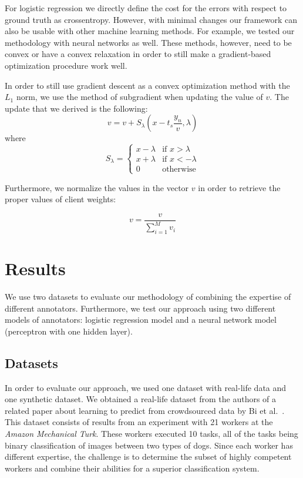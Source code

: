 \documentclass{llncs}
\begin{document}
 


For logistic regression we directly define the cost for the errors with respect to ground truth as crossentropy. However, with minimal changes our framework can also be usable with other machine learning methods. For example, we tested our methodology with neural networks as well. These methods, however, need to be convex or have a convex relaxation in order to still make a gradient-based optimization procedure work well.

In order to still use gradient descent as a convex optimization method with the $L_1$ norm, we use the method of subgradient when updating the value of $v$. The update that we derived is the following:
\begin{equation}
 v= v + S_{\lambda} (x-t_s \frac{y_n}{v}, \lambda)
\end{equation}
where
\begin{equation}
S_{\lambda} = 
\left\{
	\begin{array}{ll}
		x-\lambda  & \mbox{if } x > \lambda  \\
		x+\lambda & \mbox{if } x < -\lambda \\
		0 & \mbox{otherwise}
	\end{array}
\right.
\end{equation}

Furthermore, we normalize the values in the vector $v$ in order to retrieve the proper values of client weights:

\begin{equation}
v = \frac{v}{\sum_{i=1}^M v_i}
\end{equation}

 

\section{Results}

We use two datasets to evaluate our methodology of combining the expertise of different annotators. Furthermore, we test our approach using two different models of annotators: logistic regression model and a neural network model (perceptron with one hidden layer).

\subsection{Datasets}
In order to evaluate our approach, we used one dataset with real-life data and one synthetic dataset. We obtained a real-life dataset from the authors of a related paper about learning to predict from crowdsourced data by Bi et al.~\cite{bi2014learning}. This dataset consists of results from an experiment with 21 workers at the \textit{Amazon Mechanical Turk}. These workers executed 10 tasks, all of the tasks being binary classification of images between two types of dogs. Since each worker has different expertise, the challenge is to determine the subset of highly competent workers and combine their abilities for a superior classification system.
\end{document}
